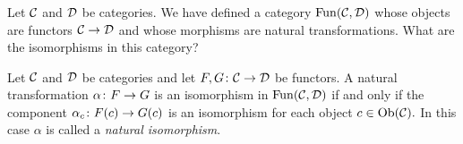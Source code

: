\documentclass[../main/CT4S-EN-RU]{subfiles}
\begin{document}
\subsubsection{}

\begin{blockENG}
Let $\mathcal{C}$ and $\mathcal{D}$ be categories. We have defined a category $\operatorname{Fun}(\mathcal{C},\mathcal{D})$ whose objects are functors $\mathcal{C}\rightarrow\mathcal{D}$ and whose morphisms are natural transformations. What are the isomorphisms in this category? 
\end{blockENG}

\begin{blockRUS}
\end{blockRUS}

\begin{lemmaENG}\label{lemma:natural iso}
Let $\mathcal{C}$ and $\mathcal{D}$ be categories and let $F,G\colon\mathcal{C}\rightarrow\mathcal{D}$ be functors. A natural transformation $\alpha\colon F\rightarrow G$ is an isomorphism in $\operatorname{Fun}(\mathcal{C},\mathcal{D})$ if and only if the component $\alpha_c\colon F(c)\rightarrow G(c)$ is an isomorphism for each object $c\in\operatorname{Ob}(\mathcal{C}).$ In this case $\alpha$ is called a {\em natural isomorphism}.
\end{lemmaENG}

\begin{lemmaRUS}\label{lemma:natural iso}
\end{lemmaRUS}
\end{document}

